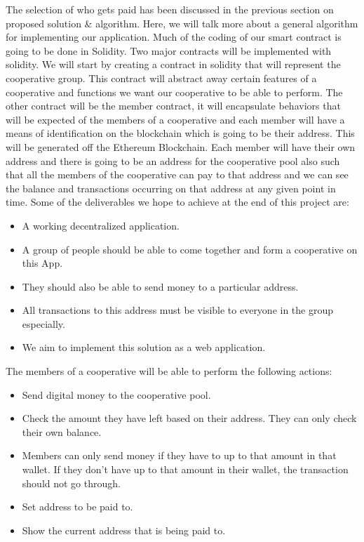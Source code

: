 \documentclass{article}
\begin{document}
\begin{flushleft}
The selection of who gets paid has been discussed in the previous section on proposed solution \& algorithm. Here, we will talk more about a general algorithm for implementing our application. Much of the coding of our smart contract is going to be done in Solidity. Two major contracts will be implemented with solidity. We will start by creating a contract in solidity that will represent the cooperative group. This contract will abstract away certain features of a cooperative and functions we want our cooperative to be able to perform. The other contract will be the member contract, it will encapsulate behaviors that will be expected of the members of a cooperative and each member will have a means of identification on the blockchain which is going to be their address. This will be generated off the Ethereum Blockchain. Each member will have their own address and there is going to be an address for the cooperative pool also such that all the members of the cooperative can pay to that address and we can see the balance and transactions occurring on that address at any given point in time.
Some of the deliverables we hope to achieve at the end of this project are:
\begin{itemize}
    \item A working decentralized application.
    \item A group of people should be able to come together and form a cooperative on this App.
    \item They should also be able to send money to a particular address.
    \item All transactions to this address must be visible to everyone in the group especially.
    \item We aim to implement this solution as a web application.
\end{itemize}

The members of a cooperative will be able to perform the following actions:
\begin{itemize}
    \item Send digital money to the cooperative pool.
    \item Check the amount they have left based on their address. They can only check their own balance.
    \item Members can only send money if they have to up to that amount in that wallet. If they don't have up to that amount in their wallet, the transaction should not go through.
    \item Set address to be paid to.
    \item Show the current address that is being paid to.
\end{itemize}


\end{flushleft}
\end{document}
